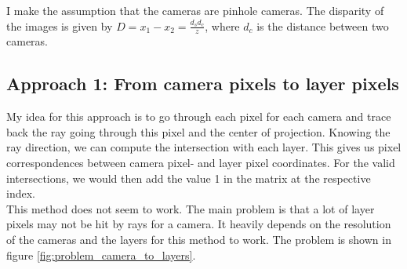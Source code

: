 \documentclass[11pt,a4paper,titlepage]{article}
\begin{document}
I make the assumption that the cameras are pinhole cameras. The disparity of the images is given by $D = x_1 - x_2 = \frac{d_s d_c}{z}$, where $d_c$ is the distance between two cameras.

\subsection{Approach 1: From camera pixels to layer pixels}
My idea for this approach is to go through each pixel for each camera and trace back the ray going through this pixel and the center of projection. Knowing the ray direction, we can compute the intersection with each layer. This gives us pixel correspondences between camera pixel- and layer pixel coordinates. For the valid intersections, we would then add the value 1 in the matrix at the respective index. 
\\
This method does not seem to work. The main problem is that a lot of layer pixels may not be hit by rays for a camera. It heavily depends on the resolution of the cameras and the layers for this method to work. The problem is shown in figure \ref{fig:problem_camera_to_layers}.
\end{document}
